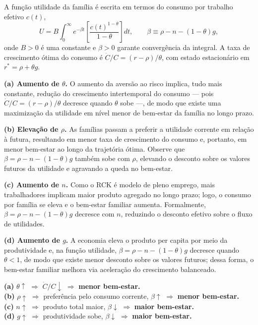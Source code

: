 \documentclass[12pt, a4paper]{article}
\begin{document}
A função utilidade da família é escrita em termos do consumo por trabalho efetivo $c(t)$,
\[
U = B\int_0^\infty e^{-\beta t}\left[\frac{c(t)^{1-\theta}}{1-\theta}\right]dt, \qquad \beta \equiv \rho - n - (1-\theta)g,
\]
onde $B > 0$ é uma constante e $\beta > 0$ garante convergência da integral. A taxa de crescimento ótima do consumo é $\dot{C}/C = (r-\rho)/\theta$, com estado estacionário em $r^* = \rho + \theta g$.

\textbf{(a) Aumento de $\theta$.} O aumento da aversão ao risco implica, tudo mais constante, redução do crescimento intertemporal do consumo — pois $\dot{C}/C = (r-\rho)/\theta$ decresce quando $\theta$ sobe —, de modo que existe uma maximização da utilidade em nível menor de bem-estar da família no longo prazo.

\textbf{(b) Elevação de $\rho$.} As famílias passam a preferir a utilidade corrente em relação à futura, resultando em menor taxa de crescimento do consumo e, portanto, em menor bem-estar ao longo da trajetória ótima. Observe que $\beta = \rho - n - (1-\theta)g$ também sobe com $\rho$, elevando o desconto sobre os valores futuros da utilidade e agravando a queda no bem-estar.

\textbf{(c) Aumento de $n$.} Como o RCK é modelo de pleno emprego, mais trabalhadores implicam maior produto agregado no longo prazo; logo, o consumo por família se eleva e o bem-estar familiar aumenta. Formalmente, $\beta = \rho - n - (1-\theta)g$ decresce com $n$, reduzindo o desconto efetivo sobre o fluxo de utilidades.

\textbf{(d) Aumento de $g$.} A economia eleva o produto per capita por meio da produtividade e, na função utilidade, $\beta = \rho - n - (1-\theta)g$ decresce quando $\theta < 1$, de modo que existe menor desconto sobre os valores futuros; dessa forma, o bem-estar familiar melhora via aceleração do crescimento balanceado.

\begin{resultbox}[title={Síntese: Efeitos sobre o Bem-Estar (Q1)}]
\textbf{(a)} $\theta\uparrow$ $\Rightarrow$ $\dot{C}/C\downarrow$ $\Rightarrow$ \textbf{menor bem-estar.}\\[2pt]
\textbf{(b)} $\rho\uparrow$ $\Rightarrow$ preferência pelo consumo corrente, $\beta\uparrow$ $\Rightarrow$ \textbf{menor bem-estar.}\\[2pt]
\textbf{(c)} $n\uparrow$ $\Rightarrow$ produto total maior, $\beta\downarrow$ $\Rightarrow$ \textbf{maior bem-estar.}\\[2pt]
\textbf{(d)} $g\uparrow$ $\Rightarrow$ produtividade sobe, $\beta\downarrow$ $\Rightarrow$ \textbf{maior bem-estar.}
\end{resultbox}
\end{document}
